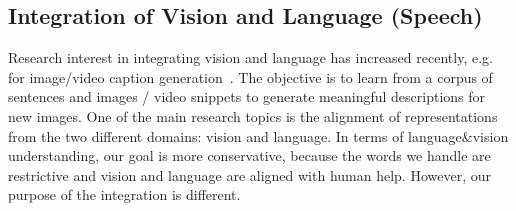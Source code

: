 






\subsection{Integration of Vision and Language (Speech)}
Research interest in integrating vision and language has increased
recently, e.g. for image/video caption generation~\citep{ show:tell:caption, youtube2text,
  fgm:coling14, deep:alignment:vl, babytalk}.  The objective is to
learn from a corpus of sentences and images / video snippets to
generate meaningful descriptions for new images. One of the main
research topics is the alignment of representations from the two
different domains: vision and language. In terms of language\&vision
understanding, our goal is more conservative, because the words we
handle are restrictive and vision and language are aligned with human
help.  However, our purpose of the integration is different.

